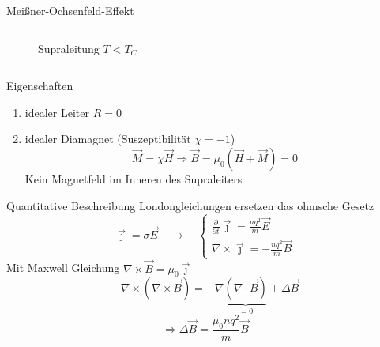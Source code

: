 \begin{frame}{Meißner-Ochsenfeld-Effekt}
\begin{columns}
\begin{column}{0.49\textwidth}
\begin{figure}
    \caption{Supraleitung $T < T_{C}$}
    \label{fig: bfeld_supraleitung}
  \end{figure}
\end{column}
\end{columns}
\end{frame}

\begin{frame}{Eigenschaften}
  \begin{enumerate}
    \item idealer Leiter $R = 0$
    \item idealer Diamagnet (Suszeptibilität $\chi = -1$)
    \begin{equation}
      \vec{M} = \chi \vec{H} \Rightarrow \vec{B} = \mu_0 (\vec{H} + \vec{M}) = 0
    \end{equation}
    Kein Magnetfeld im Inneren des Supraleiters
  \end{enumerate}

\end{frame}
\begin{frame}{Quantitative Beschreibung}
Londongleichungen ersetzen das ohmsche Gesetz
\begin{equation}
  \vec{\jmath} = \sigma \vec{E}\quad  \longrightarrow \quad
  \begin{cases}
    \frac{\partial }{\partial t}\vec{\jmath} = \frac{nq^2}{m}\vec{E} \\
    \nabla \times \vec{\jmath} = - \frac{n q^2}{m} \vec{B}
  \end{cases}
\end{equation}
\pause
Mit Maxwell Gleichung $\nabla \times \vec{B} = \mu_0 \vec{\jmath}$
\begin{equation}
-\nabla \times (\nabla \times \vec{B}) = -\nabla\underbrace{(\nabla \cdot \vec{B})}_{= 0} + \Delta \vec{B}
\end{equation}
\begin{equation*}
\Rightarrow  \Delta \vec{B} = \frac{\mu_0 n q^2}{m}\vec{B}
\end{equation*}
\end{frame}

